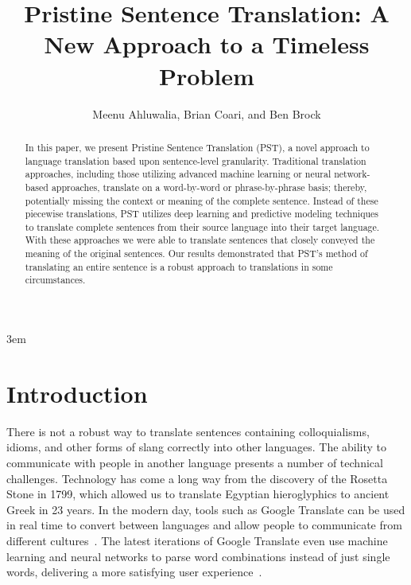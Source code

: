 \documentclass[runningheads]{llncs}
\title{Pristine Sentence Translation: A New Approach to a Timeless Problem}
\author{
	Meenu Ahluwalia, Brian Coari, and Ben Brock
}
\institute{Master of Science in Data Science \\ Southern Methodist University \\ Dallas, Texas USA \\
	\email{\{mahluwalia, bcoari, bbrock\}@smu.edu}}
\begin{document}
	\emergencystretch 3em
	\maketitle
	
	\begin{abstract}

In this paper, we present Pristine Sentence Translation (PST), a novel approach to language translation based upon sentence-level granularity. Traditional translation approaches, including those utilizing advanced machine learning or neural network-based approaches, translate on a word-by-word or phrase-by-phrase basis; thereby, potentially missing the context or meaning of the complete sentence. Instead of these piecewise translations, PST utilizes deep learning and predictive modeling techniques to translate complete sentences from their source language into their target language. With these approaches we were able to translate sentences that closely conveyed the meaning of the original sentences. Our results demonstrated that PST's method of translating an entire sentence is a robust approach to translations in some circumstances.
		
	\end{abstract}
	
	
	\section{Introduction}
	
	There is not a robust way to translate sentences containing colloquialisms, idioms, and other forms of slang correctly into other languages. The ability to communicate with people in another language presents a number of technical challenges. Technology has come a long way from the discovery of the Rosetta Stone in 1799, which allowed us to translate Egyptian hieroglyphics to ancient Greek in 23 years. In the modern day, tools such as Google Translate can be used in real time to convert between languages and allow people to communicate from different cultures~\cite{ref_url6}. The latest iterations of Google Translate even use machine learning and neural networks to parse word combinations instead of just single words, delivering a more satisfying user experience~\cite{ref_url7}.
	
\end{document}
